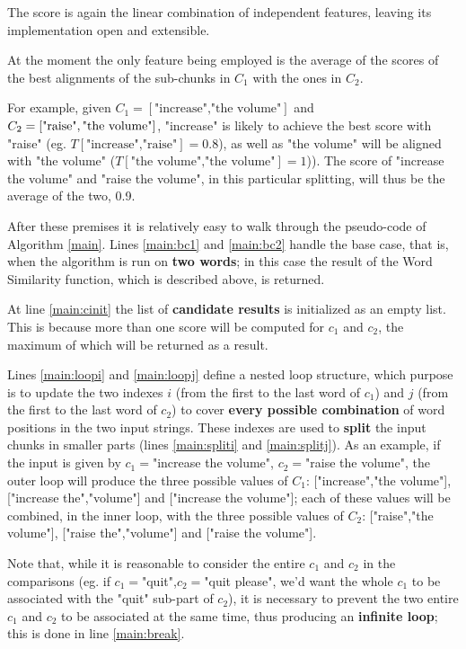 \begin{itemize}
The score is again the linear combination of independent features, leaving its implementation open and extensible.

At the moment the only feature being employed is the average of the scores of the best alignments of the sub-chunks in $C_1$ with the ones in $C_2$.

For example, given $C_1=[\text{"increase","the volume"}]$ and $C_2=[\text{"raise"},\\ \text{"the volume"}]$, "increase" is likely to achieve the best score with "raise" (eg. $T[\text{"increase","raise"}]=0.8$), as well as "the volume" will be aligned with "the volume" ($T[\text{"the volume","the volume"}]=1$)). The score of "increase the volume" and "raise the volume", in this particular splitting, will thus be the average of the two, 0.9.
\end{itemize}
After these premises it is relatively easy to walk through the pseudo-code of Algorithm \ref{main}. Lines \ref{main:bc1} and \ref{main:bc2} handle the base case, that is, when the algorithm is run on \textbf{two words}; in this case the result of the Word Similarity function, which is described above, is returned.

At line \ref{main:cinit} the list of \textbf{candidate results} is initialized as an empty list. This is because more than one score will be computed for $c_1$ and $c_2$, the maximum of which will be returned as a result.

Lines \ref{main:loopi} and \ref{main:loopj} define a nested loop structure, which purpose is to update the two indexes $i$ (from the first to the last word of $c_1$) and $j$ (from the first to the last word of $c_2$) to cover \textbf{every possible combination} of word positions in the two input strings. These indexes are used to \textbf{split} the input chunks in smaller parts (lines \ref{main:spliti} and \ref{main:splitj}). As an example, if the input is given by $c_1=$"increase the volume", $c_2=$"raise the volume", the outer loop will produce the three possible values of $C_1$: ["increase","the volume"], ["increase the","volume"] and ["increase the volume"]; each of these values will be combined, in the inner loop, with the three possible values of $C_2$: ["raise","the volume"], ["raise the","volume"] and ["raise the volume"].

Note that, while it is reasonable to consider the entire $c_1$ and $c_2$ in the comparisons (eg. if $c_1=$"quit",$c_2=$"quit please", we'd want the whole $c_1$ to be associated with the "quit" sub-part of $c_2$), it is necessary to prevent the two entire $c_1$ and $c_2$ to be associated at the same time, thus producing an \textbf{infinite loop}; this is done in line \ref{main:break}.

